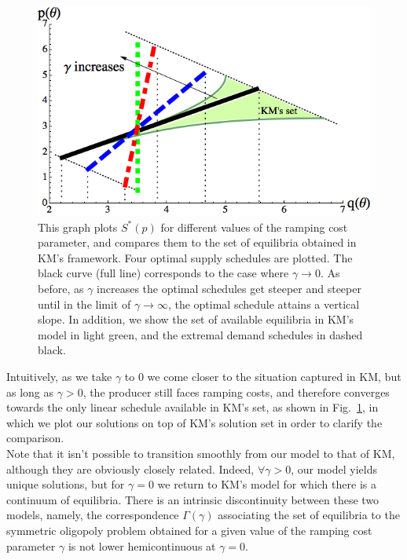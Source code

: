 \begin{figure}[h] 
\centering
\includegraphics[width=12cm]{figch1/oligovraiKMd.png}
\caption{\small{This graph plots $S^*(p)$ for different values of the ramping cost parameter, and compares them to the set of equilibria obtained in KM's framework. Four optimal supply schedules are plotted. The black curve (full line) corresponds to the case where $\gamma\to0$. As before, as $\gamma$ increases the optimal schedules get steeper and steeper until in the limit of $\gamma\to\infty$, the optimal schedule attains a vertical slope. In addition, we show the set of available equilibria in KM's model in light green, and the extremal demand schedules in dashed black.  }} \label{fig:oligop}
\end{figure}

Intuitively, as we take $\gamma$ to $0$ we come closer to the situation captured in KM, but as long as $\gamma>0$, the producer still faces ramping costs, and therefore converges towards the only linear schedule available in KM's set, as shown in Fig.~\ref{fig:oligop}, in which we plot our solutions on top of KM's solution set in order to clarify the comparison. \\

Note that it isn't possible to transition smoothly from our model to that of KM, although they are obviously closely related. Indeed, $\forall \gamma>0$, our model yields unique solutions, but for $\gamma=0$ we return to KM's model for which there is a continuum of equilibria. There is an intrinsic discontinuity between these two models, namely, the correspondence $\Gamma(\gamma)$ associating the set of equilibria to the symmetric oligopoly problem obtained for a given value of the ramping cost parameter $\gamma$ is not lower hemicontinuous at $\gamma=0$. \\

